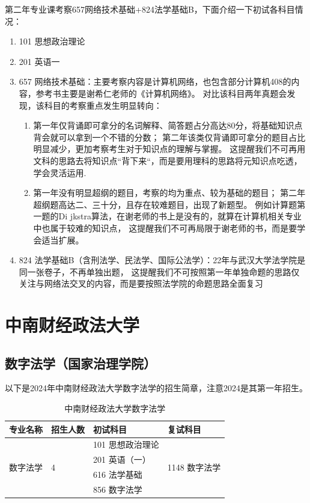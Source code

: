 \documentclass[12pt, a4paper, oneside]{ctexart}
\begin{document}
        第二年专业课考察657网络技术基础+824法学基础B，下面介绍一下初试各科目情况：
\begin{enumerate}
    \item 101 思想政治理论
    \item 201 英语一
    \item 657 网络技术基础：主要考察内容是计算机网络，也包含部分计算机408的内容，参考书主要是谢希仁老师的《计算机网络》。
          对比该科目两年真题会发现，该科目的考察重点发生明显转向：
          \begin{enumerate}
            \item 第一年仅背诵即可拿分的名词解释、简答题占分高达80分，将基础知识点背会就可以拿到一个不错的分数；
                  第二年该类仅背诵即可拿分的题目占比明显减少，更加考察考生对于知识点的理解与掌握。
                  这提醒我们不可再用文科的思路去将知识点“背下来“，而是要用理科的思路将元知识点吃透，学会灵活运用.
            \item 第一年没有明显超纲的题目，考察的均为重点、较为基础的题目；
                  第二年超纲题高达二、三十分，且存在较难题目，出现了新题型。
                  例如计算题第一题的Di jkstra算法，在谢老师的书上是没有的，就算在计算机相关专业中也属于较难的知识点，
                  这提醒我们不可再局限于谢老师的书，而是要学会适当扩展。
          \end{enumerate}
    \item 824 法学基础B（含刑法学、民法学、国际公法学）：22年与武汉大学法学院是同一张卷子，不再单独出题，
          这提醒我们不可按照第一年单独命题的思路仅关注与网络法交叉的内容，而是要按照法学院的命题思路全面复习
\end{enumerate}



\newpage
\section{中南财经政法大学}

\subsection{数字法学（国家治理学院）}

以下是2024年中南财经政法大学数字法学的招生简章，注意2024是其第一年招生。
\begin{table}[h]
    \centering
    \caption{中南财经政法大学数字法学}
    \begin{tabular}{|l|l|l|l|}
    \hline
        专业名称 & 招生人数 & 初试科目 & 复试科目 \\
    \hline
        \multirow{4}{*}{数字法学} & \multirow{4}{*}{4} & 101 思想政治理论 & \multirow{4}{*}{1148 数字法学} \\
    
         && 201 英语（一） & \\
    
         && 616 法学基础 & \\
    
         && 856 数字法学 & \\
    \hline
    \end{tabular}
    \label{table_MAP}
\end{table}
\end{document}
